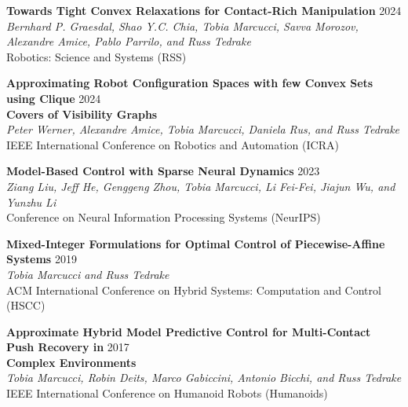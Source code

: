 \documentclass[11pt,a4paper,sans,twoside]{moderncv}
\begin{document}
\begin{enumerate}[label={[C\arabic*]}]
\item \textbf{Towards Tight Convex Relaxations for Contact-Rich Manipulation} \hfill 2024 \\
\textit{Bernhard P. Graesdal, Shao Y.C. Chia, Tobia Marcucci, Savva Morozov, Alexandre Amice, Pablo Parrilo, and Russ Tedrake} \\
Robotics: Science and Systems (RSS)

\item \textbf{Approximating Robot Configuration Spaces with few Convex Sets using Clique} \hfill 2024 \\ \textbf{Covers of Visibility Graphs}  \\
\textit{Peter Werner, Alexandre Amice, Tobia Marcucci, Daniela Rus, and Russ Tedrake} \\
IEEE International Conference on Robotics and Automation (ICRA)


\item \textbf{Model-Based Control with Sparse Neural Dynamics} \hfill 2023 \\
\textit{Ziang Liu, Jeff He, Genggeng Zhou, Tobia Marcucci, Li Fei-Fei, Jiajun Wu, and Yunzhu Li} \\
Conference on Neural Information Processing Systems (NeurIPS)

\item \textbf{Mixed-Integer Formulations for Optimal Control of Piecewise-Affine Systems} \hfill 2019 \\
\textit{Tobia Marcucci and Russ Tedrake} \\
ACM International Conference on Hybrid Systems: Computation and Control (HSCC)

\item \textbf{Approximate Hybrid Model Predictive Control for Multi-Contact Push Recovery in} \hfill 2017 \\ \textbf{Complex Environments} \\
\textit{Tobia Marcucci, Robin Deits, Marco Gabiccini, Antonio Bicchi, and Russ Tedrake} \\
IEEE International Conference on Humanoid Robots (Humanoids)


\end{enumerate}
\end{document}
